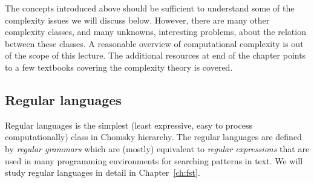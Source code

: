 The concepts introduced above should be sufficient to understand
some of the complexity issues we will discuss below.
However, there are many other complexity classes,
and many unknowns, interesting problems,
about the relation between these classes.
A reasonable overview of computational complexity is
out of the scope of this lecture.
The additional resources at end of the chapter points to
a few textbooks covering the complexity theory is covered.

\subsection{Regular languages}

Regular languages is the simplest
(least expressive, easy to process computationally)
class in Chomsky hierarchy.
The regular languages are defined by \emph{regular grammars}
which are (mostly) equivalent to \emph{regular expressions}
that are used in many programming environments
for searching patterns in text.
We will study regular languages in detail in Chapter~\ref{ch:fst}.

